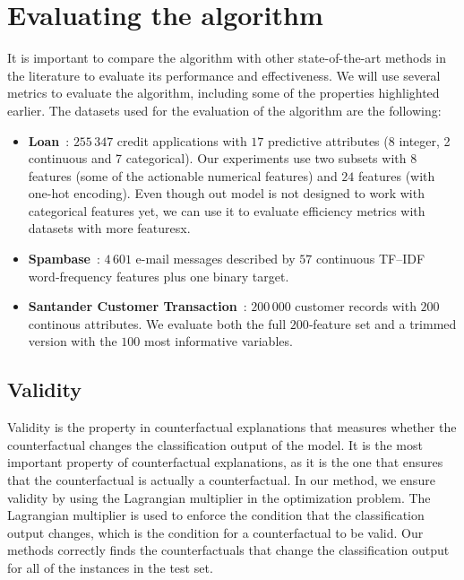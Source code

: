 \documentclass[12pt]{extarticle}
\numberwithin{equation}{section}
\begin{document}
\section{Evaluating the algorithm}\label{sec:evaluation}
It is important to compare the algorithm with other state-of-the-art methods in the literature to evaluate its performance and effectiveness. We will use several metrics to evaluate the algorithm, including some of the properties highlighted earlier. The datasets used for the evaluation of the algorithm are the following:
\begin{itemize}
  \item \textbf{Loan}~\cite{kaggleLoan1}: $255\,347$ credit
        applications with $17$ predictive attributes (8 integer, 2 continuous and 7 categorical).  Our experiments use two subsets with $8$ features (some of the actionable numerical features) and $24$ features (with one-hot encoding). Even though out model is not designed to work with categorical features yet, we can use it to evaluate efficiency metrics with datasets with more featuresx.
  \item \textbf{Spambase}~\cite{spambase}: $4\,601$ e-mail messages described by $57$ continuous TF–IDF word‐frequency features plus one binary target. 
  \item \textbf{Santander Customer Transaction}~\cite{santander}:
        $200\,000$ customer records with $200$ continous attributes.
        We evaluate both the full $200$‐feature set and a trimmed version with
        the $100$ most informative variables.
\end{itemize}

\subsection{Validity}\label{sec:validity}
Validity is the property in counterfactual explanations that measures whether the counterfactual changes the classification output of the model. It is the most important property of counterfactual explanations, as it is the one that ensures that the counterfactual is actually a counterfactual. In our method, we ensure validity by using the Lagrangian multiplier in the optimization problem. The Lagrangian multiplier is used to enforce the condition that the classification output changes, which is the condition for a counterfactual to be valid. Our methods correctly finds the counterfactuals that change the classification output for all of the instances in the test set.
\end{document}
